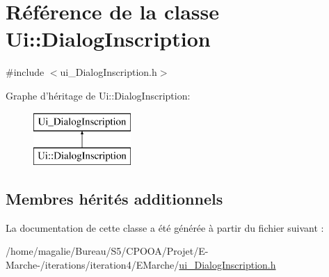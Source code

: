 \hypertarget{class_ui_1_1_dialog_inscription}{\section{Référence de la classe Ui\-:\-:Dialog\-Inscription}
\label{class_ui_1_1_dialog_inscription}
}


{\ttfamily \#include $<$ui\-\_\-\-Dialog\-Inscription.\-h$>$}

Graphe d'héritage de Ui\-:\-:Dialog\-Inscription\-:\begin{figure}[H]
\begin{center}
\leavevmode
\includegraphics[height=2.000000cm]{class_ui_1_1_dialog_inscription}
\end{center}
\end{figure}
\subsection*{Membres hérités additionnels}


La documentation de cette classe a été générée à partir du fichier suivant \-:\begin{DoxyCompactItemize}
\item 
/home/magalie/\-Bureau/\-S5/\-C\-P\-O\-O\-A/\-Projet/\-E-\/\-Marche-\//iterations/iteration4/\-E\-Marche/\hyperlink{ui___dialog_inscription_8h}{ui\-\_\-\-Dialog\-Inscription.\-h}\end{DoxyCompactItemize}
